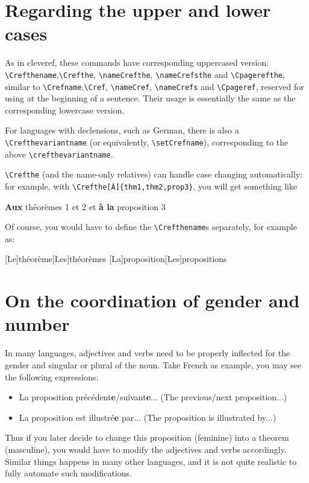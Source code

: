 \documentclass[classical]{einfart}
\newenvironment{demo}
  {%
    \LocallyStopLineNumbers%
    \begin{tcolorbox}[enhanced jigsaw,pad at break*=1mm,breakable,
        left=2.5mm,right=3mm,top=0.5mm,bottom=0mm,
        colback=gray!5!paper,boxrule=0pt,frame hidden,
        borderline west={1.2mm}{0mm}{gray!55!paper},arc=.7mm]%
  }
  {%
    \end{tcolorbox}%
    \ResumeLineNumbers%
  }
\begin{document}
\section{Regarding the upper and lower cases}

As in \textsf{cleveref}, these commands have corresponding uppercased version: \lstinline|\Crefthename|,\linebreak \lstinline|\Crefthe|, \lstinline|\nameCrefthe|, \lstinline|\nameCrefsthe| and \lstinline|\Cpagerefthe|, similar to \lstinline|\Crefname|,\linebreak \lstinline|\Cref|, \lstinline|\nameCref|, \lstinline|\nameCrefs| and \lstinline|\Cpageref|, reserved for using at the beginning of a sentence. Their usage is essentially the same as the corresponding lowercase version.

For languages with declensions, such as German, there is also a \lstinline|\Crefthevariantname| (or equivalently, \lstinline|\setCrefname|), corresponding to the above \lstinline|\crefthevariantname|.

\lstinline|\Crefthe| (and the name-only relatives) can handle case changing automatically: for example, with \lstinline|\Crefthe[À]{thm1,thm2,prop3}|, you will get something like

\begin{demo}
    \textbf{Aux} théorèmes 1 et 2 et \textbf{à la} proposition 3
\end{demo}

Of course, you would have to define the \lstinline|\Crefthename|s separately, for example as:

\begin{code}
[Le]{théorème}[Les]{théorèmes}
[La]{proposition}[Les]{propositions}
\end{code}

\enlargethispage*{\baselineskip}
\section{On the coordination of gender and number}

In many languages, adjectives and verbs need to be properly inflected for the gender and singular or plural of the noun. Take French as example, you may see the following expressions:
\begin{itemize}
    \item La proposition précédent\textbf{e}/suivant\textbf{e}... (The previous/next proposition...)
    \item La proposition est illustré\textbf{e} par... (The proposition is illustrated by...)
\end{itemize}
Thus if you later decide to change this proposition (feminine) into a theorem (masculine), you would have to modify the adjectives and verbs accordingly. Similar things happens in many other languages, and it is not quite realistic to fully automate such modifications.
\end{document}
